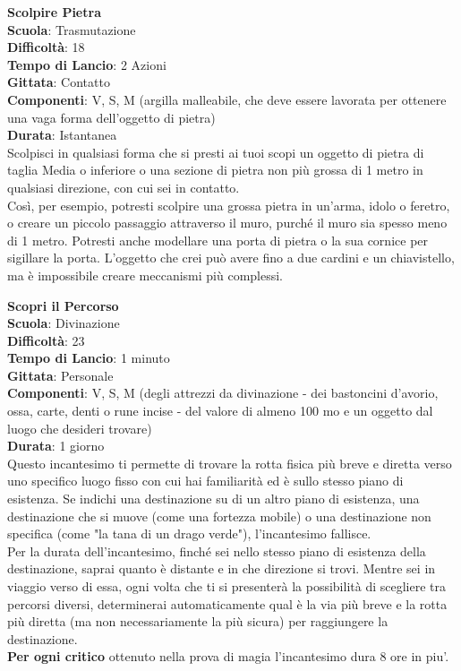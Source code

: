 \begin{multicols}{2}
\medskip\textbf{Scolpire Pietra}\\
\textbf{Scuola}: Trasmutazione\\
\textbf{Difficoltà}: 18\\
\textbf{Tempo di Lancio}: 2 Azioni\\
\textbf{Gittata}: Contatto\\
\textbf{Componenti}: V, S, M (argilla malleabile, che deve essere lavorata per ottenere una vaga forma dell'oggetto di pietra)\\
\textbf{Durata}: Istantanea\\
Scolpisci in qualsiasi forma che si presti ai tuoi scopi un oggetto di pietra di taglia Media o inferiore o una sezione di pietra non più grossa di 1 metro in qualsiasi direzione, con cui sei in contatto.\\
Così, per esempio, potresti scolpire una grossa pietra in un'arma, idolo o feretro, o creare un piccolo passaggio attraverso il muro, purché il muro sia spesso meno di 1 metro. Potresti anche modellare una porta di pietra o la sua cornice per sigillare la porta. L'oggetto che crei può avere fino a due cardini e un chiavistello, ma è impossibile creare meccanismi più complessi.

\medskip\textbf{Scopri il Percorso}\\
\textbf{Scuola}: Divinazione\\
\textbf{Difficoltà}: 23\\
\textbf{Tempo di Lancio}: 1 minuto\\
\textbf{Gittata}: Personale\\
\textbf{Componenti}: V, S, M (degli attrezzi da divinazione - dei bastoncini d'avorio, ossa, carte, denti o rune incise - del valore di almeno 100 mo e un oggetto dal luogo che desideri trovare)\\
\textbf{Durata}: 1 giorno\\
Questo incantesimo ti permette di trovare la rotta fisica più breve e diretta verso uno specifico luogo fisso con cui hai familiarità ed è sullo stesso piano di esistenza. Se indichi una destinazione su di un altro piano di esistenza, una destinazione che si muove (come una fortezza mobile) o una destinazione non specifica (come "la tana di un drago verde"), l'incantesimo fallisce.\\
Per la durata dell'incantesimo, finché sei nello stesso piano di esistenza della destinazione, saprai quanto è distante e in che direzione si trovi. Mentre sei in viaggio verso di essa, ogni volta che ti si presenterà la possibilità di scegliere tra percorsi diversi, determinerai automaticamente qual è la via più breve e la rotta più diretta (ma non necessariamente la più sicura) per raggiungere la destinazione.\\
\textbf{Per ogni critico} ottenuto nella prova di magia l'incantesimo dura 8 ore in piu'.


\end{multicols}
